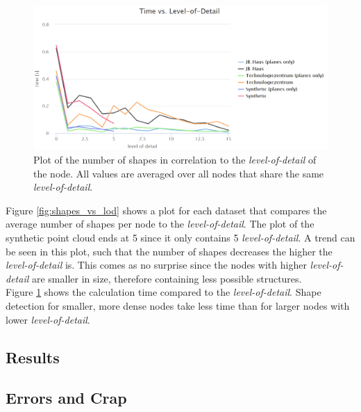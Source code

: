 \begin{figure}[h]
    \centering
    \includegraphics[width=1\textwidth]{Results/time_vs_lod.png}
    \caption{Plot of the number of shapes in correlation to the \textit{level-of-detail} of the node. All values are averaged over all nodes that share the same \textit{level-of-detail}.}
    \label{fig:time_vs_lod}
\end{figure}

Figure \ref{fig:shapes_vs_lod} shows a plot for each dataset that compares the average number of shapes per node to the \textit{level-of-detail}. The plot of the synthetic point cloud ends at 5 since it only contains 5 \textit{level-of-detail}. A trend can be seen in this plot, such that the number of shapes decreases the higher the \textit{level-of-detail} is. This comes as no surprise since the nodes with higher \textit{level-of-detail} are smaller in size, therefore containing less possible structures. 
\\

Figure \ref{fig:time_vs_lod} shows the calculation time compared to the \textit{level-of-detail}. Shape detection for smaller, more dense nodes take less time than for larger nodes with lower \textit{level-of-detail}. 


\subsection{Results}


\subsection{Errors and Crap \todo{}}

